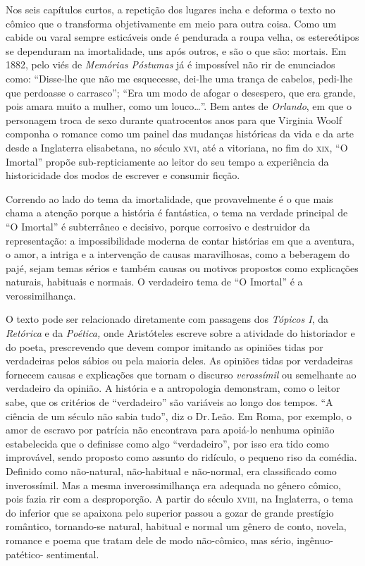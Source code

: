 Nos seis capítulos curtos, a repetição dos lugares incha e deforma o
texto no cômico que o transforma objetivamente em meio para outra coisa.
Como um cabide ou varal sempre esticáveis onde é pendurada a roupa
velha, os estereótipos se dependuram na imortalidade, uns após outros, e
são o que são: mortais. Em 1882, pelo viés de \emph{Memórias Póstumas}
já é impossível não rir de enunciados como: ``Disse-lhe que não me
esquecesse, dei-lhe uma trança de cabelos, pedi-lhe que perdoasse o
carrasco''; ``Era um modo de afogar o desespero, que era grande, pois
amara muito a mulher, como um louco\ldots{}''. Bem antes de \emph{Orlando}, em
que o personagem troca de sexo durante quatrocentos anos para que
Virginia Woolf componha o romance como um painel das mudanças históricas
da vida e da arte desde a Inglaterra elisabetana, no século \textsc{xvi}, até a
vitoriana, no fim do \textsc{xix}, ``O Imortal'' propõe sub-repticiamente ao leitor
do seu tempo a experiência da historicidade dos modos de escrever e
consumir ficção.

Correndo ao lado do tema da imortalidade, que provavelmente é o que mais
chama a atenção porque a história é fantástica, o tema na verdade
principal de ``O Imortal'' é subterrâneo e decisivo, porque corrosivo e
destruidor da representação: a impossibilidade moderna de contar
histórias em que a aventura, o amor, a intriga e a intervenção de causas
maravilhosas, como a beberagem do pajé, sejam temas sérios e também
causas ou motivos propostos como explicações naturais, habituais e
normais. O verdadeiro tema de ``O Imortal'' é a verossimilhança.

O texto pode ser relacionado diretamente com passagens dos \emph{Tópicos
I}, da \emph{Retórica} e da \emph{Poética,} onde Aristóteles escreve
sobre a atividade do historiador e do poeta, prescrevendo que devem
compor imitando as opiniões tidas por verdadeiras pelos sábios ou pela
maioria deles. As opiniões tidas por verdadeiras fornecem causas e
explicações que tornam o discurso \emph{verossímil} ou semelhante ao
verdadeiro da opinião. A história e a antropologia demonstram, como o
leitor sabe, que os critérios de ``verdadeiro'' são variáveis ao longo dos
tempos. ``A ciência de um século não sabia tudo'', diz o Dr.\,Leão. Em
Roma, por exemplo, o amor de escravo por patrícia não encontrava para
apoiá-lo nenhuma opinião estabelecida que o definisse como algo
``verdadeiro'', por isso era tido como improvável, sendo proposto como
assunto do ridículo, o pequeno riso da comédia. Definido como
não-natural, não-habitual e não-normal, era classificado como
inverossímil. Mas a mesma inverossimilhança era adequada no gênero
cômico, pois fazia rir com a desproporção. A partir do século \textsc{xviii}, na
Inglaterra, o tema do inferior que se apaixona pelo superior passou a
gozar de grande prestígio romântico, tornando-se natural, habitual e
normal um gênero de conto, novela, romance e poema que tratam dele de
modo não-cômico, mas sério, ingênuo-patético- sentimental.

